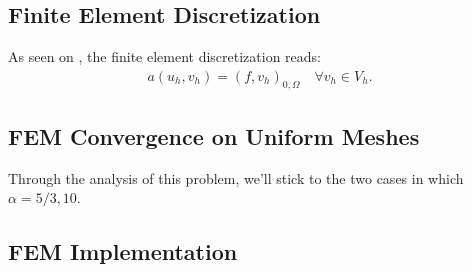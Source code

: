 \subsection{Finite Element Discretization}
As seen on , the finite element discretization reads:
\begin{gather}
	a(u_h, v_h) = (f, v_h)_{0, \Omega} \quad \forall v_h \in V_h.
\end{gather}

\subsection{FEM Convergence on Uniform Meshes}

Through the analysis of this problem, we'll stick to the two cases in which $\alpha = 5/3, 10$.

\subsection{FEM Implementation}

